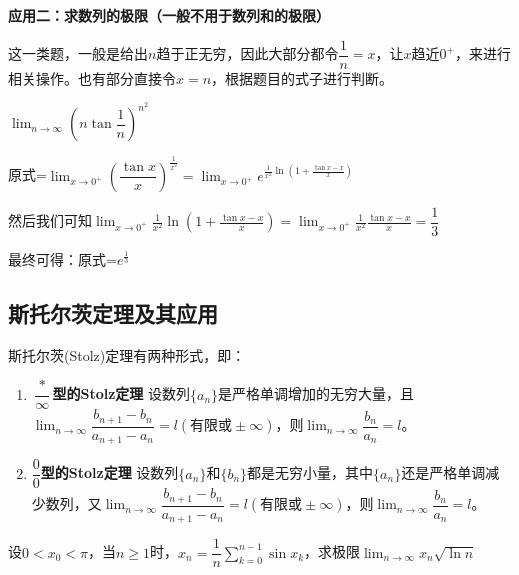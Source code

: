 \textbf{应用二：求数列的极限（一般不用于数列和的极限）}

这一类题，一般是给出$n$趋于正无穷，因此大部分都令$\dfrac{1}{n}=x$，让$x$趋近$0^+$，来进行相关操作。也有部分直接令$x=n$，根据题目的式子进行判断。
\vspace{2mm}

\begin{example}
    $\displaystyle\lim_{n\rightarrow\infty}\left(n\tan\dfrac{1}{n}\right)^{n^2}$
\end{example}

\begin{solution}
    原式=$\displaystyle\lim_{x\rightarrow 0^+}\left(\dfrac{\tan x}{x}\right)^{\frac{1}{x^2}}=\lim_{x\rightarrow0^+}e^{{\frac{1}{x^2}}\ln(1+\frac{\tan x-x}{x})}$

    然后我们可知$\displaystyle\lim_{x\rightarrow0^+}\frac{1}{x^2}\ln \left(1+\frac{\tan x-x}{x}\right)=\lim_{x\rightarrow0^+}\frac{1}{x^2}\frac{\tan x-x}{x}=\dfrac{1}{3}$
    \vspace{1mm}

    最终可得：原式=$\displaystyle e^{\frac{1}{3}}$
\end{solution}

\subsection{斯托尔茨定理及其应用}
斯托尔茨(Stolz)定理有两种形式，即：
\begin{enumerate}
    \item $\dfrac{*}{\infty}$\textbf{型的Stolz定理} \quad 设数列$\{a_n\}$是严格单调增加的无穷大量，且$\displaystyle\lim_{n\rightarrow\infty}\dfrac{b_{n+1}-b_n}{a_{n+1}-a_n}=l(\mbox{有限或}\pm\infty)$，则$\displaystyle\lim_{n\rightarrow\infty}\dfrac{b_n}{a_n}=l$。

    \item $\dfrac{0}{0}$\textbf{型的Stolz定理} \quad 设数列$\{a_n\}$和$\{b_n\}$都是无穷小量，其中$\{a_n\}$还是严格单调减少数列，又$\displaystyle\lim_{n\rightarrow\infty}\dfrac{b_{n+1}-b_n}{a_{n+1}-a_n}=l(\mbox{有限或}\pm\infty)$，则$\displaystyle\lim_{n\rightarrow\infty}\dfrac{b_n}{a_n}=l$。
\end{enumerate}

\begin{example}
    设$0<x_0<\pi$，当$n\geq 1$时，$x_n=\dfrac{1}{n}\displaystyle\sum_{k=0}^{n-1}\sin x_k$，求极限$\displaystyle\lim_{n\rightarrow\infty}x_n\sqrt{\ln n}$
\end{example}

